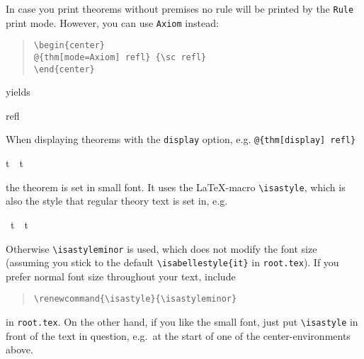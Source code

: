 \begin{isabellebody}
\begin{isamarkuptext}
In case you print theorems without premises no rule will be printed by the
\texttt{Rule} print mode. However, you can use \texttt{Axiom} instead:
\begin{quote}
\verb!\begin{center}!\\
\verb!@!\verb!{thm[mode=Axiom] refl} {\sc refl}! \\
\verb!\end{center}!
\end{quote}
yields
\begin{center}
 {\sc refl} 
\end{center}%
\end{isamarkuptext}%
\isamarkuptrue%
%
\isamarkuptrue%
%
\begin{isamarkuptext}%
When displaying theorems with the \texttt{display} option, e.g.
\verb!@!\verb!{thm[display] refl}! \begin{isabelle}%
t\ {\isacharequal}\ t%
\end{isabelle} the theorem is
set in small font. It uses the \LaTeX-macro \verb!\isastyle!,
which is also the style that regular theory text is set in, e.g.%
\end{isamarkuptext}%
\isamarkuptrue%
\isamarkupfalse%
\ {\isachardoublequoteopen}t\ {\isacharequal}\ t{\isachardoublequoteclose}%
\isadelimproof
%
\endisadelimproof
%
\isatagproof
%
\endisatagproof
{\isafoldproof}%
%
\isadelimproof
%
\endisadelimproof
%
\begin{isamarkuptext}%
\noindent Otherwise \verb!\isastyleminor! is used,
which does not modify the font size (assuming you stick to the default
\verb!\isabellestyle{it}! in \texttt{root.tex}). If you prefer
normal font size throughout your text, include
\begin{quote}
\verb!\renewcommand{\isastyle}{\isastyleminor}!
\end{quote}
in \texttt{root.tex}. On the other hand, if you like the small font,
just put \verb!\isastyle! in front of the text in question,
e.g.\ at the start of one of the center-environments above.


\end{isamarkuptext}
\end{isabellebody}
